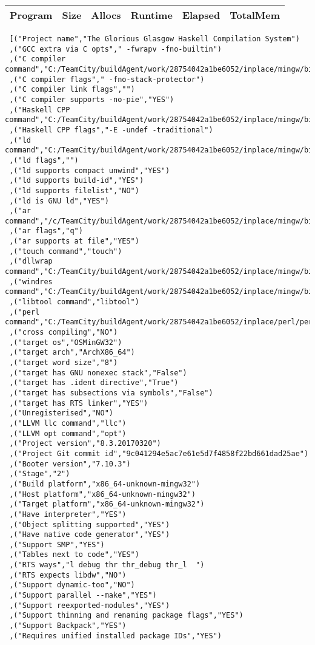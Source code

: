 \begin{tabular}{ c c c c c c }
Program & Size & Allocs & Runtime & Elapsed & TotalMem\\
\hline
\end{tabular}
\begin{verbatim}
 [("Project name","The Glorious Glasgow Haskell Compilation System")
 ,("GCC extra via C opts"," -fwrapv -fno-builtin")
 ,("C compiler command","C:/TeamCity/buildAgent/work/28754042a1be6052/inplace/mingw/bin/gcc.exe")
 ,("C compiler flags"," -fno-stack-protector")
 ,("C compiler link flags","")
 ,("C compiler supports -no-pie","YES")
 ,("Haskell CPP command","C:/TeamCity/buildAgent/work/28754042a1be6052/inplace/mingw/bin/gcc.exe")
 ,("Haskell CPP flags","-E -undef -traditional")
 ,("ld command","C:/TeamCity/buildAgent/work/28754042a1be6052/inplace/mingw/bin/ld.exe")
 ,("ld flags","")
 ,("ld supports compact unwind","YES")
 ,("ld supports build-id","YES")
 ,("ld supports filelist","NO")
 ,("ld is GNU ld","YES")
 ,("ar command","/c/TeamCity/buildAgent/work/28754042a1be6052/inplace/mingw/bin/ar")
 ,("ar flags","q")
 ,("ar supports at file","YES")
 ,("touch command","touch")
 ,("dllwrap command","C:/TeamCity/buildAgent/work/28754042a1be6052/inplace/mingw/bin/dllwrap.exe")
 ,("windres command","C:/TeamCity/buildAgent/work/28754042a1be6052/inplace/mingw/bin/windres.exe")
 ,("libtool command","libtool")
 ,("perl command","C:/TeamCity/buildAgent/work/28754042a1be6052/inplace/perl/perl")
 ,("cross compiling","NO")
 ,("target os","OSMinGW32")
 ,("target arch","ArchX86_64")
 ,("target word size","8")
 ,("target has GNU nonexec stack","False")
 ,("target has .ident directive","True")
 ,("target has subsections via symbols","False")
 ,("target has RTS linker","YES")
 ,("Unregisterised","NO")
 ,("LLVM llc command","llc")
 ,("LLVM opt command","opt")
 ,("Project version","8.3.20170320")
 ,("Project Git commit id","9c041294e5ac7e61e5d7f4858f22bd661dad25ae")
 ,("Booter version","7.10.3")
 ,("Stage","2")
 ,("Build platform","x86_64-unknown-mingw32")
 ,("Host platform","x86_64-unknown-mingw32")
 ,("Target platform","x86_64-unknown-mingw32")
 ,("Have interpreter","YES")
 ,("Object splitting supported","YES")
 ,("Have native code generator","YES")
 ,("Support SMP","YES")
 ,("Tables next to code","YES")
 ,("RTS ways","l debug thr thr_debug thr_l  ")
 ,("RTS expects libdw","NO")
 ,("Support dynamic-too","NO")
 ,("Support parallel --make","YES")
 ,("Support reexported-modules","YES")
 ,("Support thinning and renaming package flags","YES")
 ,("Support Backpack","YES")
 ,("Requires unified installed package IDs","YES")

\end{verbatim}
